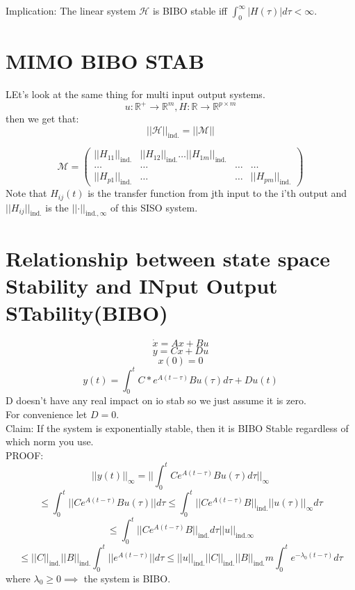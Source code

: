 \documentclass{article}
\begin{document}
Implication: The linear system $\mathscr{H}$ is BIBO stable iff $\int_0^\infty \lvert H(\tau)\rvert d\tau < \infty$.\\

\section{MIMO BIBO STAB}
LEt's look at the same thing for multi input output systems.\\
\[u:\mathbb{R}^+\to\mathbb{R}^m, H:\mathbb{R}\to \mathbb{R}^{p\times m}\]
then we get that:\\
\[\lvert\lvert \mathscr{H}\rvert\rvert_{\text{ind.}}=\lvert\lvert \mathscr{M}\rvert\rvert\]

\[\mathscr{M}=\begin{pmatrix}\lvert\lvert H_{11}\rvert\rvert_{\text{ind.}} & \lvert\lvert H_{12}\rvert\rvert_{\text{ind.}} \dots \lvert\lvert H_{1m}\rvert\rvert_{\text{ind.}}\\ \dots & \dots & \dots &\dots\\ \lvert\lvert H_{p1}\rvert\rvert_{\text{ind.}} &\dots &\dots &\lvert\lvert H_{pm}\rvert\rvert_{\text{ind.}}\end{pmatrix}\]
Note that $H_{ij}(t)$ is the transfer function from jth input to the i'th output and $\lvert\lvert H_{ij}\rvert\rvert_{\text{ind.}}$ is the $\lvert\lvert \cdot\rvert\rvert_{\text{ind.},\infty}$ of this SISO system.\\

\section{Relationship between state space Stability and INput Output STability(BIBO)}
\[\dot{x}=Ax+Bu\]
\[y=Cx+Du\]
\[x(0)=0\]
\[y(t)=\int_0^t C*e^{A(t-\tau)}Bu(\tau)d\tau +Du(t)\]
D doesn't have any real impact on io stab so we just assume it is zero.\\
For convenience let $D=0$.\\
Claim: If the system is exponentially stable, then it is BIBO Stable regardless of which norm you use.\\
PROOF:\\
\[\lvert\lvert y(t)\rvert\rvert_\infty=\lvert\lvert \int_0^t Ce^{A(t-\tau)}Bu(\tau)d\tau\rvert\rvert_{\infty}\]
\[\leq \int_0^t\lvert\lvert Ce^{A(t-\tau)}Bu(\tau)\rvert\rvert d\tau\leq \int_0^t\lvert\lvert Ce^{A(t-\tau)}B\rvert\rvert_{\text{ind.}}\lvert\lvert u(\tau)\rvert\rvert_\infty d\tau\]
\[\leq \int_0^t \lvert\lvert Ce^{A(t-\tau)}B\rvert\rvert_{\text{ind.}}d\tau \lvert\lvert u\rvert\rvert_{\text{ind.}\infty}\]
\[\leq \lvert\lvert C\rvert\rvert_{\text{ind.}}\lvert\lvert B\rvert\rvert_{\text{ind.}}\int_0^t\lvert\lvert e^{A(t-\tau)}\rvert\rvert d\tau\leq \lvert\lvert u\rvert\rvert_{\text{ind.}}\lvert\lvert C\rvert\rvert_{\text{ind.}}\lvert\lvert B\rvert\rvert_{\text{ind.}}m\int_0^t e^{-\lambda_0(t-\tau)}d\tau\]
where $\lambda_0\geq 0\implies$ the system is BIBO.\\
\end{document}

